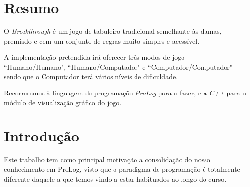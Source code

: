 \documentclass[15pt,a4paper]{article}
\begin{document}
\section*{Resumo}


O \textit{Breakthrough} é um jogo de tabuleiro tradicional semelhante às damas, premiado e com um conjunto de regras muito simples e acessível.

A implementação pretendida irá oferecer três modos de jogo - ``Humano/Humano", ``Humano/Computador" e ``Computador/Computador" - sendo que o Computador terá vários níveis
de dificuldade.

Recorreremos à linguagem de programação \textit{ProLog} para o fazer, e a \textit{C++}  para o módulo de visualização gráfico do jogo.

\tableofcontents

\newpage



\section{Introdução}




Este trabalho tem como principal motivação a consolidação do nosso conhecimento em ProLog, visto que o paradigma de programação é totalmente diferente daquele a que temos vindo a estar habituados ao longo do curso.
\end{document}
